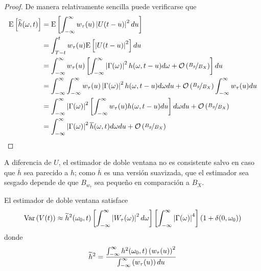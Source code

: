 \begin{proof}
De manera relativamente sencilla puede verificarse que
\begin{align*}
\mathrm{E}\left[ \widehat{h}(\omega,t) \right] &= 
\mathrm{E}\left[ \int_{-\infty}^{\infty} w_\tau (u) \left| U(t-u) \right|^{2} du \right] \\
&= 
\int_{T-t}^{t} w_\tau (u) \mathrm{E}\left[ \left| U(t-u) \right|^{2} \right] du \\
&=
\int_{-\infty}^{\infty} w_\tau (u) \left[
\int_{-\infty}^{\infty} \left| \Gamma(\omega) \right|^{2} h(\omega, t-u)d\omega + \mathcal{O}\left( \nicefrac{B_g}{B_X} \right) \right] du \\
&=
\int_{-\infty}^{\infty} \int_{-\infty}^{\infty} w_\tau (u) \left| \Gamma(\omega) \right|^{2} h(\omega, t-u)d\omega du +
\mathcal{O}\left( \nicefrac{B_g}{B_X} \right) \int_{-\infty}^{\infty} w_\tau (u) du \\
&=
\int_{-\infty}^{\infty} \left| \Gamma(\omega) \right|^{2} \left[ \int_{-\infty}^{\infty} w_\tau (u) h(\omega, t-u) du \right] d\omega du +
\mathcal{O}\left( \nicefrac{B_g}{B_X} \right) \\
&=
\int_{-\infty}^{\infty} \left| \Gamma(\omega) \right|^{2} \overline{h}(\omega,t) d\omega du +
\mathcal{O}\left( \nicefrac{B_g}{B_X} \right)
\end{align*}
\end{proof}

%
A diferencia de $U$, el estimador de doble ventana no es consistente salvo en caso que $\overline{h}$ sea parecido a $h$; como $\overline{h}$ es una versión suavizada, que el estimador sea sesgado depende de que $B_{w_\tau}$ sea pequeño en comparación a $B_X$.

\begin{proposicion}
El estimador de doble ventana satisface
\begin{equation}
\mathrm{Var}\left( V(t) \right) \approx \widetilde{h}^{2}(\omega_0,t) \left[ \int_{-\infty}^{\infty} \left| W_\tau(\omega) \right|^{2} d\omega \right] \left[ \int_{-\infty}^{\infty} \left| \Gamma(\omega) \right|^{4} \right] (1+\delta(0,\omega_0))
\end{equation}
donde
\begin{equation}
\widetilde{h}^{2} = \frac{\int_{-\infty}^{\infty} h^{2}(\omega_0,t) \left(w_\tau(u)\right)^{2}}{\int_{-\infty}^{\infty} \left(w_\tau(u)\right) du}
\end{equation}
\end{proposicion}

